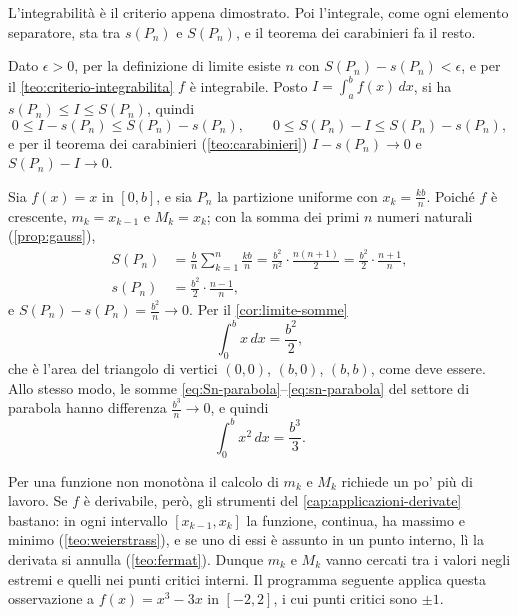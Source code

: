 \begin{schema}
\end{schema}

\begin{strategia}
L'integrabilità è il criterio appena dimostrato. Poi l'integrale, come ogni elemento
separatore, sta tra $s(P_{n})$ e $S(P_{n})$, e il teorema dei carabinieri fa il resto.
\end{strategia}

\begin{dimostrazione}
Dato $\epsilon>0$, per la definizione di limite esiste $n$ con
$S(P_{n})-s(P_{n})<\epsilon$, e per il \cref{teo:criterio-integrabilita} $f$ è
integrabile. Posto $I=\int_{a}^{b}f(x)\,dx$, si ha $s(P_{n})\le I\le S(P_{n})$, quindi
\[
  0\le I-s(P_{n})\le S(P_{n})-s(P_{n}), \qquad 0\le S(P_{n})-I\le S(P_{n})-s(P_{n}) ,
\]
e per il teorema dei carabinieri (\cref{teo:carabinieri}) $I-s(P_{n})\to0$ e
$S(P_{n})-I\to0$.
\end{dimostrazione}

\begin{esempio}\label{es:integrale-x-x2}
Sia $f(x)=x$ in $[0,b]$, e sia $P_{n}$ la partizione uniforme con $x_{k}=\frac{kb}n$.
Poiché $f$ è crescente, $m_{k}=x_{k-1}$ e $M_{k}=x_{k}$; con la somma dei primi
$n$ numeri naturali (\cref{prop:gauss}),
\[
\begin{aligned}
  S(P_{n})&=\frac bn\sum_{k=1}^{n}\frac{kb}n=\frac{b^{2}}{n^{2}}\cdot\frac{n(n+1)}2
  =\frac{b^{2}}2\cdot\frac{n+1}n,\\
  s(P_{n})&=\frac{b^{2}}2\cdot\frac{n-1}n ,
\end{aligned}
\]
e $S(P_{n})-s(P_{n})=\frac{b^{2}}n\to0$. Per il \cref{cor:limite-somme}
\begin{equation}\label{eq:integrale-x}
  \int_{0}^{b}x\,dx=\frac{b^{2}}2 ,
\end{equation}
che è l'area del triangolo di vertici $(0,0)$, $(b,0)$, $(b,b)$, come deve essere. Allo
stesso modo, le somme \eqref{eq:Sn-parabola}--\eqref{eq:sn-parabola} del settore di
parabola hanno differenza $\frac{b^{3}}n\to0$, e quindi
\begin{equation}\label{eq:integrale-x2}
  \int_{0}^{b}x^{2}\,dx=\frac{b^{3}}3 .
\end{equation}
\end{esempio}

Per una funzione non monotòna il calcolo di $m_{k}$ e $M_{k}$ richiede un po' più di
lavoro. Se $f$ è derivabile, però, gli strumenti del \cref{cap:applicazioni-derivate}
bastano: in ogni intervallo $[x_{k-1},x_{k}]$ la funzione, continua, ha massimo e minimo
(\cref{teo:weierstrass}), e se uno di essi è assunto in un punto interno, lì la derivata
si annulla (\cref{teo:fermat}). Dunque $m_{k}$ e $M_{k}$ vanno cercati tra i valori negli
estremi e quelli nei punti critici interni. Il programma seguente applica questa
osservazione a $f(x)=x^{3}-3x$ in $[-2,2]$, i cui punti critici sono $\pm1$.

